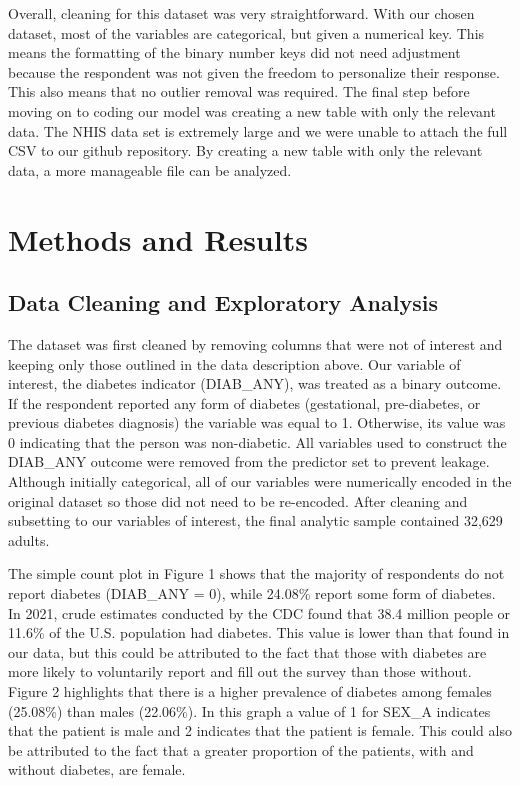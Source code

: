\documentclass{article}
\theoremstyle{plain}
\theoremstyle{definition}
\theoremstyle{remark}
\begin{document}
Overall, cleaning for this dataset was very straightforward. With our chosen dataset, most of the variables are categorical, but given a numerical key. This means the formatting of the binary number keys did not need adjustment because the respondent was not given the freedom to personalize their response. This also means that no outlier removal was required.  The final step before moving on to coding our model was creating a new table with only the relevant data. The NHIS data set is extremely large and we were unable to attach the full CSV to our github repository. By creating a new table with only the relevant data, a more manageable file can be analyzed. 
 

\section{Methods and Results}


\subsection{Data Cleaning and Exploratory Analysis}
The dataset was first cleaned by removing columns that were not of interest and keeping only those outlined in the data description above. Our variable of interest, the diabetes indicator (DIAB\_ANY), was treated as a binary outcome. If the respondent reported any form of diabetes (gestational, pre-diabetes, or previous diabetes diagnosis) the variable was equal to 1. Otherwise, its value was 0 indicating that the person was non-diabetic. All variables used to construct the DIAB\_ANY outcome were removed from the predictor set to prevent leakage. Although initially categorical, all of our variables were numerically encoded in the original dataset so those did not need to be re-encoded. After cleaning and subsetting to our variables of interest, the final analytic sample contained 32,629 adults. 

The simple count plot in Figure 1 shows that the majority of respondents do not report diabetes (DIAB\_ANY = 0), while 24.08\% report some form of diabetes. In 2021, crude estimates conducted by the CDC found that 38.4 million people or 11.6\% of the U.S. population had diabetes\cite{cdc_diabetes_stats}. This value is lower than that found in our data, but this could be attributed to the fact that those with diabetes are more likely to voluntarily report and fill out the survey than those without. Figure 2 highlights that there is a higher prevalence of diabetes among females (25.08\%) than males (22.06\%). In this graph a value of 1 for SEX\_A indicates that the patient is male and 2 indicates that the patient is female. This could also be attributed to the fact that a greater proportion of the patients, with and without diabetes, are female.
\end{document}
